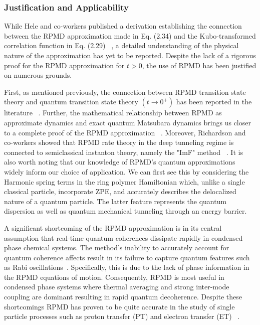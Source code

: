 \documentclass[phd,tocprelim]{cornell}
\begin{document}
\subsubsection{Justification and Applicability}
While Hele and co-workers published a derivation establishing the connection between the RPMD approximation made in Eq. (2.34) and the Kubo-transformed correlation function in Eq. (2.29) ~\cite{alt13b,alt13a}, a detailed understanding of the physical nature of the approximation has yet to be reported. Despite the lack of a rigorous proof for the RPMD approximation for $t>0$, the use of RPMD has been justified on numerous grounds.

First, as mentioned previously, the connection between RPMD transition state theory and quantum transition state theory  $(t\to 0^{+})$ has been reported in the literature ~\cite{alt13b,alt13a}. Further, the mathematical relationship between RPMD as approximate dynamics and exact quantum Matsubara dynamics brings us closer to a complete proof of the RPMD approximation ~\cite{hel15a, hel15b}. Moreover, Richardson and co-workers showed that RPMD rate theory in the deep tunneling regime is connected to semiclassical instanton theory, namely the "ImF" method ~\cite{SCA2009}. It is also worth noting that our knowledge of RPMD's quantum approximations widely inform our choice of application. We can first see this by considering the Harmonic spring terms in the ring polymer Hamiltonian which, unlike a single classical particle, incorporate ZPE, and accurately describes the delocalized nature of a quantum particle. The latter feature represents the quantum dispersion as well as quantum mechanical tunneling through an energy barrier. 

A significant shortcoming of the RPMD approximation is in its central assumption that real-time quantum coherences dissipate rapidly in condensed phase chemical systems. The method's inability to accurately account for quantum coherence affects result in its failure to capture quantum features such as Rabi oscillations~\cite{MANO2006}. Specifically, this is due to the lack of phase information in the RPMD equations of motion. Consequently, RPMD is most useful in condensed phase systems where thermal averaging and strong inter-mode coupling are dominant resulting in rapid quantum decoherence. Despite these shortcomings RPMD has proven to be quite accurate in the study of single particle processes such as proton transfer (PT) and electron transfer (ET) ~\cite{NA2011,MANO2008}.
\end{document}
